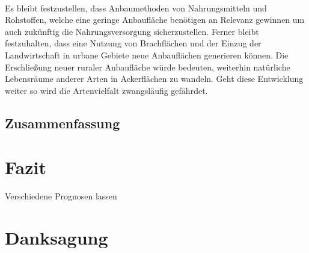 \documentclass{scrartcl}
\begin{document}
\\
Es bleibt festzustellen, dass Anbaumethoden von Nahrungsmitteln und Rohstoffen, welche eine geringe Anbaufläche benötigen an Relevanz gewinnen um auch zukünftig die Nahrungsversorgung sicherzustellen. Ferner bleibt festzuhalten, dass eine Nutzung von Brachflächen und der Einzug der Landwirtschaft in urbane Gebiete neue Anbauflächen generieren können. Die Erschließung neuer ruraler Anbaufläche würde bedeuten, weiterhin natürliche Lebensräume anderer Arten in Ackerflächen zu wandeln. Geht diese Entwicklung weiter so wird die Artenvielfalt zwangsläufig gefährdet.

\subsection{Zusammenfassung}

\section{Fazit}

Verschiedene Prognosen lassen 
\section{Danksagung}

\newpage
\listoffigures

\begingroup
\singlespacing
\setlength\bibitemsep{10pt} %
\printbibliography
\endgroup
\end{document}

